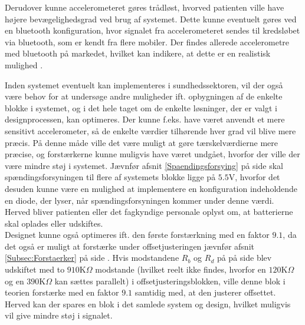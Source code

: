 Derudover kunne accelerometeret gøres trådløst, hvorved patienten ville have højere bevægelighedsgrad ved brug af systemet. Dette kunne eventuelt gøres ved en bluetooth konfiguration, hvor signalet fra accelerometeret sendes til kredsløbet via bluetooth, som er kendt fra flere mobiler. Der findes allerede accelerometre med bluetooth på markedet, hvilket kan indikere, at dette er en realistisk mulighed \cite{Axivity2015, Bioradio2015}. 

Inden systemet eventuelt kan implementeres i sundhedssektoren, vil der også være behov for at undersøge andre muligheder ift. opbygningen af de enkelte blokke i systemet, og i det hele taget om de enkelte løsninger, der er valgt i designprocessen, kan optimeres. Der kunne f.eks. have været anvendt et mere sensitivt accelerometer, så de enkelte værdier tilhørende hver grad vil blive mere præcis. På denne måde ville det være muligt at gøre tærskelværdierne mere præcise, og forstærkerne kunne muligvis have været undgået, hvorfor der ville der være mindre støj i systemet. Jævnfør afsnit \ref{Spaendingsforsying} på side \pageref{Spaendingsforsying} skal spændingsforsyningen til flere af systemets blokke ligge på $5.5$V, hvorfor det desuden kunne være en mulighed at implementere en konfiguration indeholdende en diode, der lyser, når spændingsforsyningen kommer under denne værdi. Herved bliver patienten eller det fagkyndige personale oplyst om, at batterierne skal oplades eller udskiftes. \\
Designet kunne også optimeres ift. den første forstærkning med en faktor $9.1$, da det også er muligt at forstærke under offsetjusteringen jævnfør afsnit \ref{Subsec:Forstaerker} på side \pageref{Subsec:Forstaerker}. Hvis modstandene $R_{b}$ og $R_{d}$ på  på side \pageref{fig:Forstaerker_faktor18} blev udskiftet med to $910$K$\Omega$ modstande (hvilket reelt ikke findes, hvorfor en $120$K$\Omega$ og en $390$K$\Omega$ kan sættes parallelt) i offsetjusteringsblokken, ville denne blok i teorien forstærke med en faktor $9.1$ samtidig med, at den justerer offsettet. Herved kan der spares en blok i det samlede system og design, hvilket muligvis vil give mindre støj i signalet.